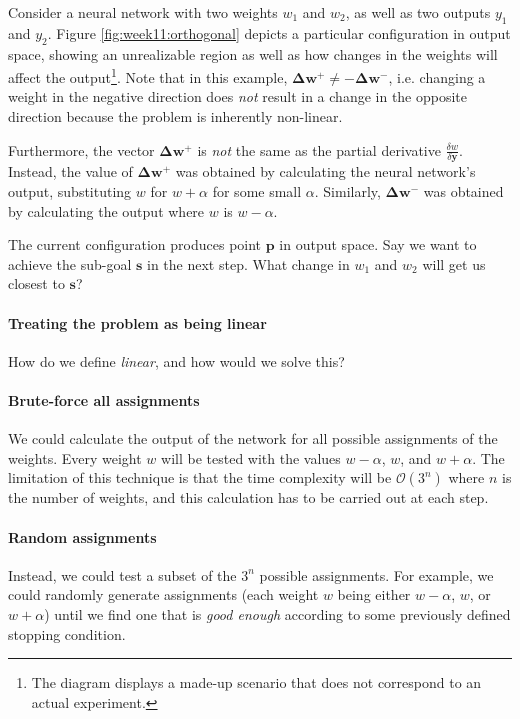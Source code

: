 \documentclass{article}
\renewcommand\vec{\mathbf}
\begin{document}
Consider a neural network with two weights $w_1$ and $w_2$, as well as two outputs $y_1$ and $y_2$. 
Figure \ref{fig:week11:orthogonal} depicts a particular configuration in output space, showing an unrealizable region as well as how changes in the weights will affect the output\footnote{The diagram displays a made-up scenario that does not correspond to an actual experiment.}. 
Note that in this example, $\vec{\Delta w^+} \neq -\vec{\Delta w^-}$, i.e. changing a weight in the negative direction does \textit{not} result in a change in the opposite direction because the problem is inherently non-linear. 

Furthermore, the vector $\vec{\Delta w^+}$ is \textit{not} the same as the partial derivative $\frac{\delta w}{\delta \vec{y}}$. 
Instead, the value of $\vec{\Delta w^+}$ was obtained by calculating the neural network's output, substituting $w$ for $w+\alpha$ for some small $\alpha$. 
Similarly, $\vec{\Delta w^-}$ was obtained by calculating the output where $w$ is $w-\alpha$. 

The current configuration produces point $\vec{p}$ in output space. 
Say we want to achieve the sub-goal $\vec{s}$ in the next step.
What change in $w_1$ and $w_2$ will get us closest to $\vec{s}$?

\paragraph{Treating the problem as being linear}
How do we define \textit{linear}, and how would we solve this?

\paragraph{Brute-force all assignments}
We could calculate the output of the network for all possible assignments of the weights. 
Every weight $w$ will be tested with the values $w-\alpha$, $w$, and $w+\alpha$. 
The limitation of this technique is that the time complexity will be $\mathcal{O}(3^n)$ where $n$ is the number of weights, and this calculation has to be carried out at each step. 

\paragraph{Random assignments}
Instead, we could test a subset of the $3^n$ possible assignments. For example, we could randomly generate assignments (each weight $w$ being either $w-\alpha$, $w$, or $w+\alpha$) until we find one that is \textit{good enough} according to some previously defined stopping condition. 
\end{document}
